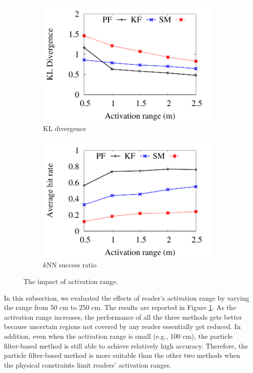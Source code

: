 \documentclass[12pt]{report}
\begin{document}
\begin{figure}[h]
  \centering
  \begin{subfigure}{.5\linewidth}
    \centering
    \includegraphics[width=\textwidth]{img/kl-r}
    \caption{KL divergence}
  \end{subfigure}%
  \begin{subfigure}{.5\linewidth}
    \centering
    \includegraphics[width=\textwidth]{img/hit-r}
    \caption{\(k\)NN success ratio}
  \end{subfigure}
  \caption{The impact of activation range.}
  \label{fig:range}
\end{figure}

In this subsection, we evaluated the effects of reader's
activation range by varying the range from 50 cm to 250 cm.  The
results are reported in Figure \ref{fig:range}.  As the activation
range increases, the performance of all the three methods gets
better because uncertain regions not covered by any reader
essentially get reduced.  In addition, even when the activation
range is small (e.g., 100 cm), the particle filter-based method is
still able to achieve relatively high accuracy.  Therefore, the
particle filter-based method is more suitable than the other two
methods when the physical constraints limit readers' activation
ranges.
\end{document}
